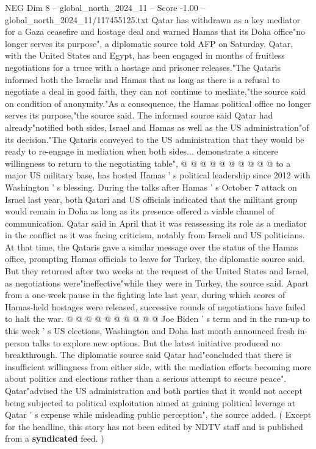 \begin{textsample}{NEG Dim 8 – global\_north\_2024\_11 – Score -1.00 – global\_north\_2024\_11/117455125.txt}  \label{ex:f8_neg_395}
Qatar has withdrawn as a key mediator for a Gaza ceasefire and hostage deal and warned Hamas that its Doha office"no longer serves its purpose", a diplomatic source told AFP on Saturday.
Qatar, with the United States and Egypt, has been engaged in months of fruitless negotiations for a truce with a hostage and prisoner releases."The Qataris informed both the Israelis and Hamas that as long as there is a refusal to negotiate a deal in good faith, they can not continue to mediate,"the source said on condition of anonymity."As a consequence, the Hamas political office no longer serves its purpose,"the source said.
The informed source said Qatar had already"notified both sides, Israel and Hamas as well as the US administration"of its decision."The Qataris conveyed to the US administration that they would be ready to re-engage in mediation when both sides... demonstrate a sincere willingness to return to the negotiating table", @ @ @ @ @ @ @ @ @ @ to a major US military base, has hosted Hamas ' s political leadership since 2012 with Washington ' s blessing.
During the talks after Hamas ' s October 7 attack on Israel last year, both Qatari and US officials indicated that the militant group would remain in Doha as long as its presence offered a viable channel of communication.
Qatar said in April that it was reassessing its role as a mediator in the conflict as it was facing criticism, notably from Israeli and US politicians.
At that time, the Qataris gave a similar message over the status of the Hamas office, prompting Hamas officials to leave for Turkey, the diplomatic source said.
But they returned after two weeks at the request of the United States and Israel, as negotiations were"ineffective"while they were in Turkey, the source said.
Apart from a one-week pause in the fighting late last year, during which scores of Hamas-held hostages were released, successive rounds of negotiations have failed to halt the war. @ @ @ @ @ @ @ @ @ @ Joe Biden ' s term and in the run-up to this week ' s US elections, Washington and Doha last month announced fresh in-person talks to explore new options.
But the latest initiative produced no breakthrough.
The diplomatic source said Qatar had"concluded that there is insufficient willingness from either side, with the mediation efforts becoming more about politics and elections rather than a serious attempt to secure peace".
Qatar"advised the US administration and both parties that it would not accept being subjected to political exploitation aimed at gaining political leverage at Qatar ' s expense while misleading public perception", the source added. ( Except for the headline, this story has not been edited by NDTV staff and is published from a \textbf{syndicated} feed. )

\end{textsample}
